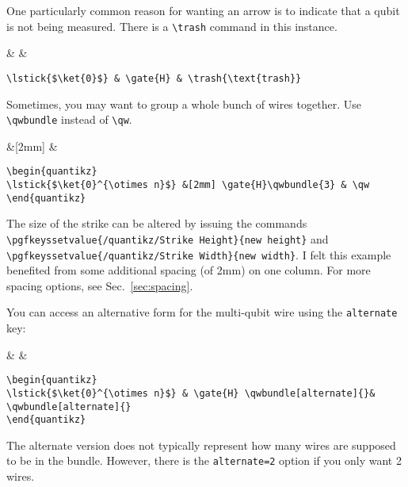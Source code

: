 \documentclass[aps,pra,10pt,nofootinbib]{revtex4}
\begin{document}
One particularly common reason for wanting an arrow is to indicate that a qubit is not being measured. There is a \verb!\trash! command in this instance.
\begin{Code}
\begin{center}
\begin{quantikz}
 &  & 
\end{quantikz}
\end{center}
\tcblower
\begin{lstlisting}
\lstick{$\ket{0}$} & \gate{H} & \trash{\text{trash}}
\end{lstlisting}
\end{Code}


Sometimes, you may want to group a whole bunch of wires together. Use \verb!\qwbundle! instead of \verb!\qw!.
\begin{Code}
\begin{center}
\begin{quantikz}
 &[2mm]  &  \qw
\end{quantikz}
\end{center}
\tcblower
\begin{lstlisting}
\begin{quantikz}
\lstick{$\ket{0}^{\otimes n}$} &[2mm] \gate{H}\qwbundle{3} & \qw
\end{quantikz}
\end{lstlisting}
\end{Code}
\noindent The size of the strike can be altered by issuing the commands \verb!\pgfkeyssetvalue{/quantikz/Strike Height}{new height}! and \verb!\pgfkeyssetvalue{/quantikz/Strike Width}{new width}!. I felt this example benefited from some additional spacing (of 2mm) on one column. For more spacing options, see Sec.\ \ref{sec:spacing}.

You can access an alternative form for the multi-qubit wire using the \verb!alternate! key:
\begin{Code}
\begin{center}
\begin{quantikz}
 &  \qwbundle[alternate]{}&  \qwbundle[alternate]{} 
\end{quantikz}
\end{center}
\tcblower
\begin{lstlisting}
\begin{quantikz}
\lstick{$\ket{0}^{\otimes n}$} & \gate{H} \qwbundle[alternate]{}& \qwbundle[alternate]{} 
\end{quantikz}
\end{lstlisting}
\end{Code}
\noindent The alternate version does not typically represent how many wires are supposed to be in the bundle. However, there is the \texttt{alternate=2} option if you only want 2 wires.
\end{document}
